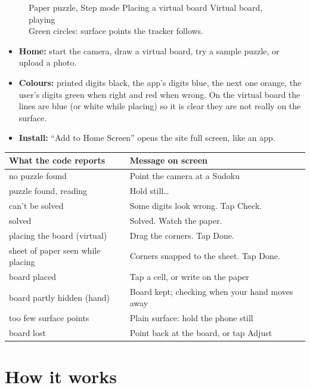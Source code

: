 \documentclass[11pt]{article}
\begin{document}
\begin{figure}[H]
\vspace{4pt}
\small Paper puzzle, Step mode \hspace{1.5cm} Placing a virtual board \hspace{1.7cm} Virtual board, playing\\
\scriptsize Green circles: surface points the tracker follows.
\end{figure}

\begin{itemize}
  \item \textbf{Home:} start the camera, draw a virtual board, try a sample puzzle, or upload a
        photo.
  \item \textbf{Colours:} printed digits black, the app's digits blue, the next one orange, the
        user's digits green when right and red when wrong. On the virtual board the lines are blue
        (or white while placing) so it is clear they are not really on the surface.
  \item \textbf{Install:} ``Add to Home Screen'' opens the site full screen, like an app.
\end{itemize}

\begin{tabularx}{\textwidth}{@{}lX@{}}
\toprule
What the code reports & Message on screen \\
\midrule
no puzzle found & Point the camera at a Sudoku \\
puzzle found, reading & Hold still\dots \\
can't be solved & Some digits look wrong. Tap Check. \\
solved & Solved. Watch the paper. \\
\midrule
placing the board (virtual) & Drag the corners. Tap Done. \\
sheet of paper seen while placing & Corners snapped to the sheet. Tap Done. \\
board placed & Tap a cell, or write on the paper \\
board partly hidden (hand) & Board kept; checking when your hand moves away \\
too few surface points & Plain surface: hold the phone still \\
board lost & Point back at the board, or tap Adjust \\
\bottomrule
\end{tabularx}

\section{How it works}
\end{document}
